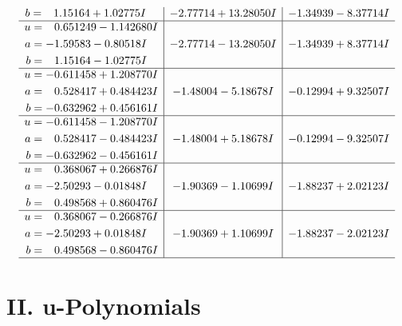 \documentclass[1p]{elsarticle_modified}
\theoremstyle{definition}
\begin{document}
$$\begin{array}{c|c|c}
\begin{aligned}
b &= \phantom{-}1.15164 + 1.02775 I\end{aligned}
 & -2.77714 + 13.28050 I & -1.34939 - 8.37714 I \\ \hline\begin{aligned}
u &= \phantom{-}0.651249 - 1.142680 I \\
a &= -1.59583 - 0.80518 I \\
b &= \phantom{-}1.15164 - 1.02775 I\end{aligned}
 & -2.77714 - 13.28050 I & -1.34939 + 8.37714 I \\ \hline\begin{aligned}
u &= -0.611458 + 1.208770 I \\
a &= \phantom{-}0.528417 + 0.484423 I \\
b &= -0.632962 + 0.456161 I\end{aligned}
 & -1.48004 - 5.18678 I & -0.12994 + 9.32507 I \\ \hline\begin{aligned}
u &= -0.611458 - 1.208770 I \\
a &= \phantom{-}0.528417 - 0.484423 I \\
b &= -0.632962 - 0.456161 I\end{aligned}
 & -1.48004 + 5.18678 I & -0.12994 - 9.32507 I \\ \hline\begin{aligned}
u &= \phantom{-}0.368067 + 0.266876 I \\
a &= -2.50293 - 0.01848 I \\
b &= \phantom{-}0.498568 + 0.860476 I\end{aligned}
 & -1.90369 - 1.10699 I & -1.88237 + 2.02123 I \\ \hline\begin{aligned}
u &= \phantom{-}0.368067 - 0.266876 I \\
a &= -2.50293 + 0.01848 I \\
b &= \phantom{-}0.498568 - 0.860476 I\end{aligned}
 & -1.90369 + 1.10699 I & -1.88237 - 2.02123 I\\
 \hline 
 \end{array}$$\newpage
\newpage\renewcommand{\arraystretch}{1}
\centering \section*{ II. u-Polynomials}
\end{document}

